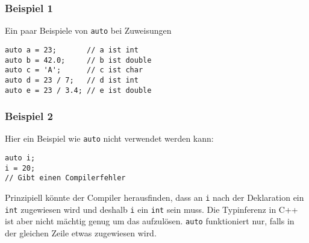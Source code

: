 \documentclass[11pt]{article}
\begin{document}
\subsubsection{Beispiel 1}
\label{sec-4-5-3}
Ein paar Beispiele von \verb~auto~ bei Zuweisungen
\begin{verbatim}
auto a = 23;       // a ist int
auto b = 42.0;     // b ist double
auto c = 'A';      // c ist char
auto d = 23 / 7;   // d ist int
auto e = 23 / 3.4; // e ist double
\end{verbatim}
\subsubsection{Beispiel 2}
\label{sec-4-5-4}
Hier ein Beispiel wie \verb~auto~ nicht verwendet werden kann:
\begin{verbatim}
auto i;
i = 20;
// Gibt einen Compilerfehler
\end{verbatim}
Prinzipiell könnte der Compiler herausfinden, dass an \verb~i~ nach der
Deklaration ein \verb~int~ zugewiesen wird und deshalb \verb~i~ ein \verb~int~ sein
muss. Die Typinferenz in C++ ist aber nicht mächtig genug um das
aufzulösen. \verb~auto~ funktioniert nur, falls in der gleichen Zeile etwas
zugewiesen wird.
\end{document}
